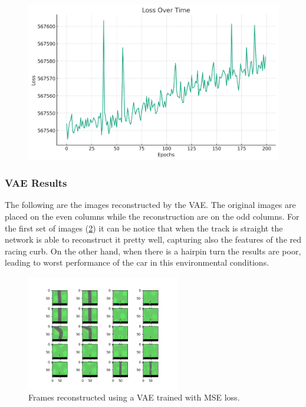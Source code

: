 \documentclass[10pt,a4paper]{article}
\begin{document}
\begin{figure}[h!]
    \centering
    \includegraphics[width=1\textwidth]{./images/bce_loss.png}
    \caption{}
    \label{fig:bce}
\end{figure}

\newpage
\subsubsection{VAE Results}
The following are the images reconstructed by the VAE. The original images are placed on the even columns while the reconstruction are on the odd columns. For the first set of images (\ref{fig:vaemse}) it can be notice that when the track is straight the network is able to reconstruct it pretty well, capturing also the features of the red racing curb. On the other hand, when there is a hairpin turn the results are poor, leading to worst performance of the car in this environmental conditions.

\begin{figure}[h!]
    \centering
    \includegraphics[width=0.6\textwidth]{images/mse/good.png}
    \caption{Frames reconstructed using a VAE trained with MSE loss.}
    \label{fig:vaemse}
\end{figure}
\end{document}
